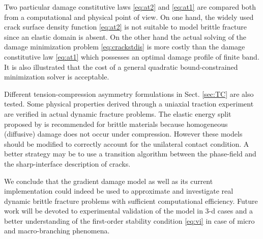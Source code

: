 Two particular damage constitutive laws \eqref{eq:at2} and \eqref{eq:at1} are compared both from a computational and physical point of view. On one hand, the widely used crack surface density function \eqref{eq:at2} is not suitable to model brittle fracture since an elastic domain is absent. On the other hand the actual solving of the damage minimization problem \eqref{eq:crackstdis} is more costly than the damage constitutive law \eqref{eq:at1} which possesses an optimal damage profile of finite band. It is also illustrated that the cost of a general quadratic bound-constrained minimization solver is acceptable.

Different tension-compression asymmetry formulations in Sect. \ref{sec:TC} are also tested. Some physical properties derived through a uniaxial traction experiment are verified in actual dynamic fracture problems. The elastic energy split proposed by \cite{FreddiRoyer-Carfagni:2010} is recommended for brittle materials because homogeneous (diffusive) damage does not occur under compression. However these models should be modified to correctly account for the unilateral contact condition. A better strategy may be to use a transition algorithm between the phase-field and the sharp-interface description of cracks.

We conclude that the gradient damage model as well as its current implementation could indeed be used to approximate and investigate real dynamic brittle fracture problems with sufficient computational efficiency. Future work will be devoted to experimental validation of the model in 3-d cases and a better understanding of the first-order stability condition \eqref{eq:vi} in case of micro and macro-branching phenomena.